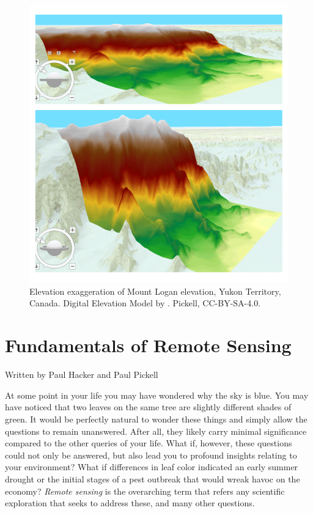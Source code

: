 \documentclass[
]{book}
\begin{document}
\begin{figure}
\includegraphics[width=0.75\linewidth]{images/09-mount-logan-exaggeration} \caption{Elevation exaggeration of Mount Logan elevation, Yukon Territory, Canada. Digital Elevation Model by \citep{natural_resources_canada_canadian_2015}. Pickell, CC-BY-SA-4.0.}\label{fig:9-mount-logan-exaggeration}
\end{figure}

\chapter{Fundamentals of Remote Sensing}\label{fundamentals-of-remote-sensing}

Written by
Paul Hacker and Paul Pickell

At some point in your life you may have wondered why the sky is blue. You may have noticed that two leaves on the same tree are slightly different shades of green. It would be perfectly natural to wonder these things and simply allow the questions to remain unanswered. After all, they likely carry minimal significance compared to the other queries of your life. What if, however, these questions could not only be answered, but also lead you to profound insights relating to your environment? What if differences in leaf color indicated an early summer drought or the initial stages of a pest outbreak that would wreak havoc on the economy? \emph{Remote sensing} is the overarching term that refers any scientific exploration that seeks to address these, and many other questions.
\end{document}
